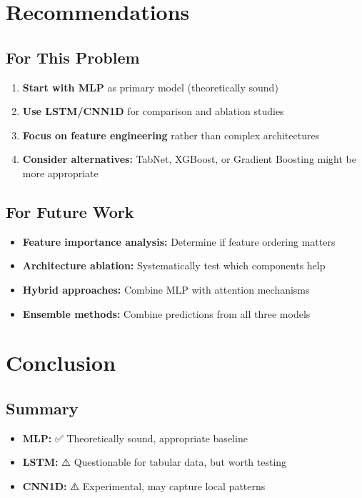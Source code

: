 \documentclass[12pt]{article}
\begin{document}
\section{Recommendations}

\subsection{For This Problem}

\begin{enumerate}
    \item \textbf{Start with MLP} as primary model (theoretically sound)
    \item \textbf{Use LSTM/CNN1D} for comparison and ablation studies
    \item \textbf{Focus on feature engineering} rather than complex architectures
    \item \textbf{Consider alternatives:} TabNet, XGBoost, or Gradient Boosting might be more appropriate
\end{enumerate}

\subsection{For Future Work}

\begin{itemize}
    \item \textbf{Feature importance analysis:} Determine if feature ordering matters
    \item \textbf{Architecture ablation:} Systematically test which components help
    \item \textbf{Hybrid approaches:} Combine MLP with attention mechanisms
    \item \textbf{Ensemble methods:} Combine predictions from all three models
\end{itemize}

\section{Conclusion}

\subsection{Summary}

\begin{itemize}
    \item \textbf{MLP:} ✅ Theoretically sound, appropriate baseline
    \item \textbf{LSTM:} ⚠️ Questionable for tabular data, but worth testing
    \item \textbf{CNN1D:} ⚠️ Experimental, may capture local patterns
\end{itemize}
\end{document}
